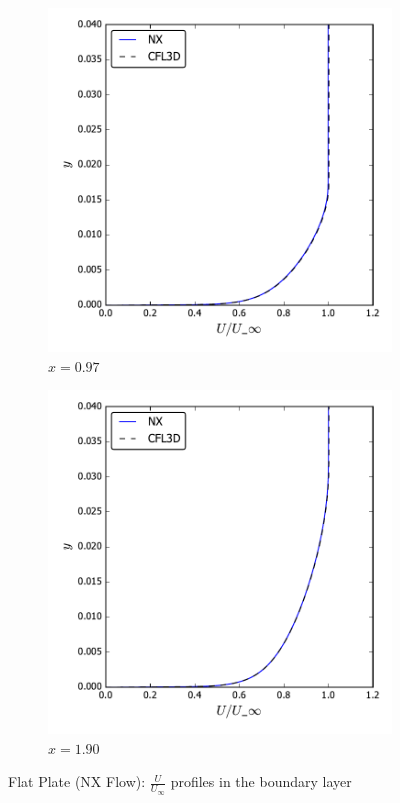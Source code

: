 \begin{figure}[ht!]
\centering
\begin{subfigure}{.45\textwidth}
  \centering
  \includegraphics[width=1.0\textwidth]{figs/flatnx/u_x097.pdf}
  \caption{$x=0.97$}
\end{subfigure}%
\begin{subfigure}{.45\textwidth}
  \centering
  \includegraphics[width=1.0\textwidth]{figs/flatnx/u_x190.pdf}
  \caption{$x=1.90$}
\end{subfigure}
\caption{Flat Plate (NX Flow): $\frac{U}{U_{\infty}}$ profiles in the boundary layer}
\label{fig:nxflatu}
\end{figure}

